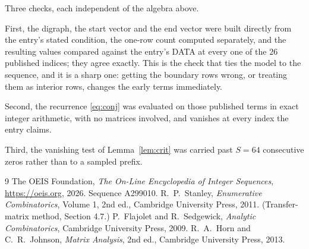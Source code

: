 \documentclass[11pt,a4paper]{article}
\theoremstyle{plain}
\theoremstyle{definition}
\begin{document}
Three checks, each independent of the algebra above.

First, the digraph, the start vector and the end vector were built directly from the
entry's stated condition, the one-row count computed separately, and the resulting values
compared against the entry's DATA at every one of the $26$ published indices; they
agree exactly. This is the check that ties the model to the sequence, and it is a sharp one:
getting the boundary rows wrong, or treating them as interior rows, changes the early terms
immediately.

Second, the recurrence \eqref{eq:conj} was evaluated on those published terms in exact
integer arithmetic, with no matrices involved, and vanishes at every index the entry claims.

Third, the vanishing test of Lemma~\ref{lem:crit} was carried past $S=64$ consecutive
zeros rather than to a sampled prefix.

\begin{thebibliography}{9}
 The OEIS Foundation, \emph{The On-Line Encyclopedia of Integer
Sequences}, \url{https://oeis.org}, 2026. Sequence A299010.
 R.~P.~Stanley, \emph{Enumerative Combinatorics}, Volume 1, 2nd ed.,
Cambridge University Press, 2011. (Transfer-matrix method, Section 4.7.)
 P.~Flajolet and R.~Sedgewick, \emph{Analytic Combinatorics}, Cambridge
University Press, 2009.
 R.~A.~Horn and C.~R.~Johnson, \emph{Matrix Analysis}, 2nd ed., Cambridge
University Press, 2013.
\end{thebibliography}
\end{document}
